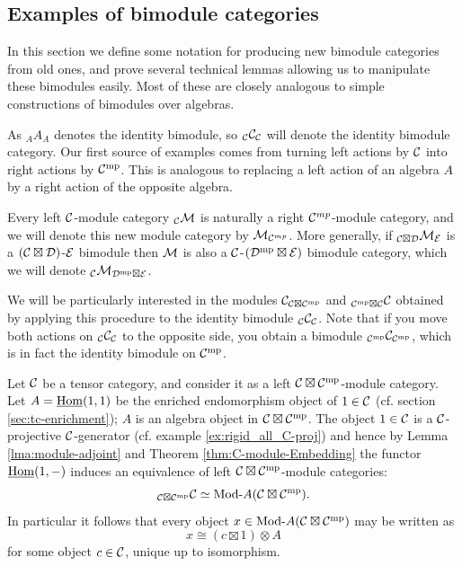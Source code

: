 \documentclass{amsart}
\begin{document}
\subsection{Examples of bimodule categories} \label{sec:examples_of_bimods}

In this section we define some notation for producing new bimodule categories from old ones, and prove several technical lemmas allowing us to manipulate these bimodules easily.  Most of these are closely analogous to simple constructions of bimodules over algebras.

As ${}_A A_A$ denotes the identity bimodule, so ${}_\mathcal C \mathcal C_{\mathcal C}$ will denote the identity bimodule category.  Our first source of examples comes from turning left actions by $\mathcal C$ into right actions by $\mathcal C^{\mathrm{mp}}$.  This is analogous to replacing a left action of an algebra $A$ by a right action of the opposite algebra.

\begin{definition}
Every left $\mathcal C$-module category ${}_\mathcal C \mathcal M$ is naturally a right $\mathcal C^{mp}$-module category, and we will denote this new module category by $\mathcal M_{\mathcal C^{mp}}$.  More generally, if ${}_{\mathcal C \boxtimes \mathcal D} \mathcal M_{\mathcal E}$ is a $(\mathcal C \boxtimes \mathcal D)$-$\mathcal E$ bimodule then $\mathcal M$ is also a $\mathcal C$-$(\mathcal D^{\mathrm{mp}} \boxtimes \mathcal E)$ bimodule category, which we will denote ${}_{\mathcal C}\mathcal M_{\mathcal D^{\mathrm{mp}} \boxtimes \mathcal E}$.
\end{definition}

We will be particularly interested in the modules $\mathcal C_{\mathcal C \boxtimes \mathcal C^{\mathrm{mp}}}$ and ${}_{\mathcal C^{\mathrm{mp}} \boxtimes \mathcal C} \mathcal C$ obtained by applying this procedure to the identity bimodule ${}_\mathcal C \mathcal C_\mathcal C$.  Note that if you move both actions on ${}_\mathcal C \mathcal C_\mathcal C$ to the opposite side, you obtain a bimodule ${}_{\mathcal C^{\mathrm{mp}}}\mathcal C_{\mathcal C^{\mathrm{mp}}}$, which is in fact the identity bimodule on $\mathcal C^{\mathrm{mp}}$.

\begin{example} \label{Ex:Hopf_bimod}
	Let $\mathcal C$ be a tensor category, and consider it as a left $\mathcal C \boxtimes \mathcal C^{\mathrm{mp}}$-module category. Let $A = \operatorname{\underline{Hom}}(1,1)$ be the enriched endomorphism object of $1 \in \mathcal C$ (cf. section \ref{sec:tc-enrichment}); $A$ is an algebra object in $\mathcal C \boxtimes \mathcal C^{\mathrm{mp}}$. 
The object $1 \in \mathcal C$ is a $\mathcal C$-projective $\mathcal C$-generator (cf. example \ref{ex:rigid_all_C-proj}) and hence by Lemma \ref{lma:module-adjoint} and Theorem \ref{thm:C-module-Embedding} the functor $\operatorname{\underline{Hom}}(1, -)$ induces an 
 equivalence of left $\mathcal C \boxtimes \mathcal C^{\mathrm{mp}}$-module categories:
	\begin{equation*}
		{}_{\cC \boxtimes \cC^\mp} \cC \simeq \Mod{}{A}(\cC \boxtimes \cC^\mp).
	\end{equation*} 
In particular it follows that every object $x \in \Mod{}{A}(\cC \boxtimes \cC^\mp)$ may be written as 
\begin{equation*}
	x \cong (c \boxtimes 1) \otimes A
\end{equation*}
for some object $c \in \mathcal C$, unique up to isomorphism. 
\end{example}
\end{document}
